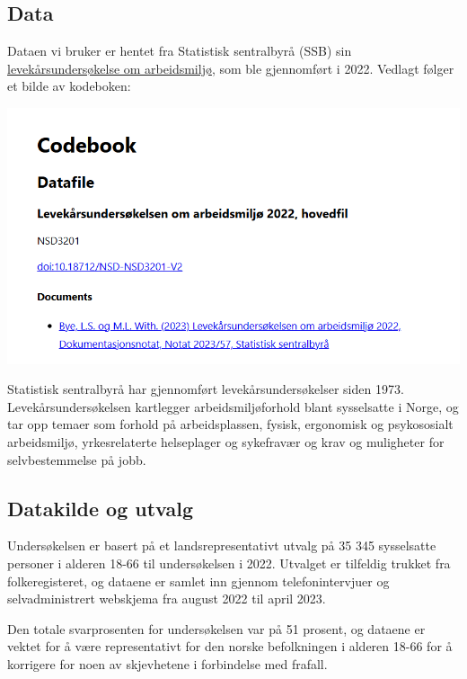 \documentclass[
  12pt,
  a4paper,
  DIV=11,
  numbers=noendperiod]{scrartcl}
\begin{document}
\subsection{Data}\label{data-1}

Dataen vi bruker er hentet fra Statistisk sentralbyrå (SSB) sin
\href{https://www.ssb.no/arbeid-og-lonn/arbeidsmiljo-sykefravaer-og-arbeidskonflikter/artikler/levekarsundersokelsen-om-arbeidsmiljo-2022}{levekårsundersøkelse
om arbeidsmiljø}, som ble gjennomført i 2022. Vedlagt følger et bilde av
kodeboken:

\includegraphics{dokumentobjekter/bilder/codebook.png}

Statistisk sentralbyrå har gjennomført levekårsundersøkelser siden 1973.
Levekårsundersøkelsen kartlegger arbeidsmiljøforhold blant sysselsatte i
Norge, og tar opp temaer som forhold på arbeidsplassen, fysisk,
ergonomisk og psykososialt arbeidsmiljø, yrkesrelaterte helseplager og
sykefravær og krav og muligheter for selvbestemmelse på jobb.

\subsection{Datakilde og utvalg}\label{datakilde-og-utvalg}

Undersøkelsen er basert på et landsrepresentativt utvalg på 35 345
sysselsatte personer i alderen 18-66 til undersøkelsen i 2022. Utvalget
er tilfeldig trukket fra folkeregisteret, og dataene er samlet inn
gjennom telefonintervjuer og selvadministrert webskjema fra august 2022
til april 2023.

Den totale svarprosenten for undersøkelsen var på 51 prosent, og dataene
er vektet for å være representativt for den norske befolkningen i
alderen 18-66 for å korrigere for noen av skjevhetene i forbindelse med
frafall.
\end{document}
